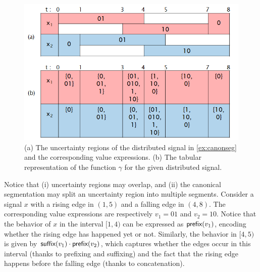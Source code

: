 \begin{figure}
	\vspace{-2em}
	\begin{center}
		\includegraphics[scale=0.33]{valexpr.png}
	\end{center}
	\caption{(a) The uncertainty regions of the distributed signal in \cref{ex:canonseg} and the corresponding value expressions. (b) The tabular representation of the function $\gamma$ for the given distributed signal.}
	\label{fig:valexpr}
\end{figure}

Notice that (i) uncertainty regions may overlap, and (ii) the canonical segmentation may split an uncertainty region into multiple segments.
Consider a signal $x$ with a rising edge in $(1,5)$ and a falling edge in $(4,8)$.
The corresponding value expressions are respectively $v_1 = 01$ and $v_2 = 10$.
Notice that the behavior of $x$ in the interval $[1,4)$ can be expressed as $\textsf{prefix}(v_1)$, encoding whether the rising edge has happened yet or not.
Similarly, the behavior in $[4,5)$ is given by $\textsf{suffix}(v_1) \cdot \textsf{prefix}(v_2)$, which captures whether the edges occur in this interval (thanks to prefixing and suffixing) and the fact that the rising edge happens before the falling edge (thanks to concatenation).




